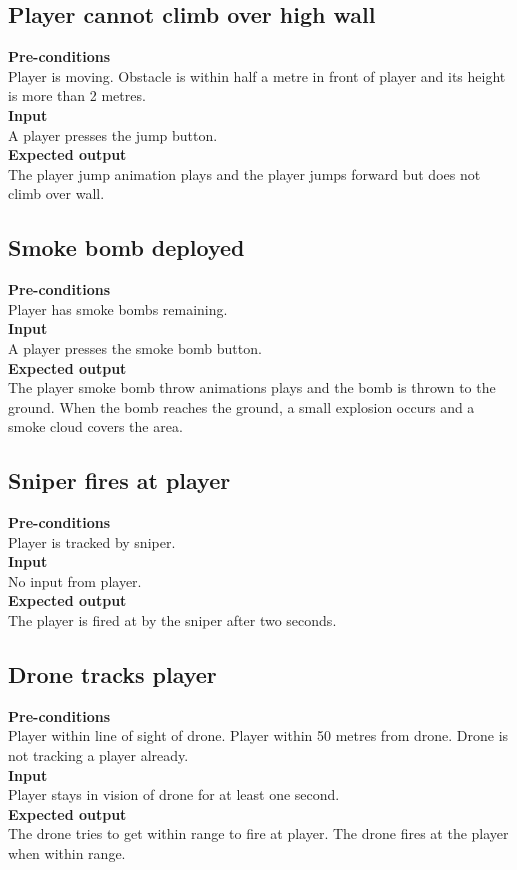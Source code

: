 \documentclass[a4paper,10pt]{article}
\begin{document}
    \subsection{Player cannot climb over high wall}
    \textbf{Pre-conditions}\\
    Player is moving. Obstacle is within half a metre in front of player and its height is more than 2 metres. 
    \smallskip\\\textbf{Input}\\
    A player presses the jump button.
    \smallskip\\\textbf{Expected output}\\
    The player jump animation plays and the player jumps forward but does not climb over wall.
        
    \subsection{Smoke bomb deployed}
    \textbf{Pre-conditions}\\
    Player has smoke bombs remaining.
    \smallskip\\\textbf{Input}\\
    A player presses the smoke bomb button.
    \smallskip\\\textbf{Expected output}\\
    The player smoke bomb throw animations plays and the bomb is thrown to the ground. When the bomb reaches the ground, a small explosion occurs and a smoke cloud covers the area.
    
    \subsection{Sniper fires at player}
    \textbf{Pre-conditions}\\
    Player is tracked by sniper.
    \smallskip\\\textbf{Input}\\
    No input from player.
    \smallskip\\\textbf{Expected output}\\
    The player is fired at by the sniper after two seconds.
    
    \subsection{Drone tracks player}
    \textbf{Pre-conditions}\\
    Player within line of sight of drone. Player within 50 metres from drone. Drone is not tracking a player already.
    \smallskip\\\textbf{Input}\\
    Player stays in vision of drone for at least one second.
    \smallskip\\\textbf{Expected output}\\
    The drone tries to get within range to fire at player. The drone fires at the player when within range.
    
\end{document}
